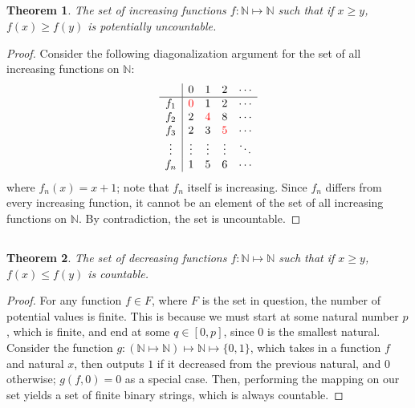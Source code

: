 \documentclass{article}
\newtheorem{theorem}{Theorem}
\newcommand{\N}{\mathbb{N}}
\begin{document}
\subsection{}

\begin{theorem}
    The set of increasing functions \(f: \N \mapsto \N\) such that if \(x \geqslant y\), \(f(x) \geqslant f(y)\) is potentially uncountable.
\end{theorem}
\begin{proof}
    Consider the following diagonalization argument for the set of all increasing functions on \(\N\):
    \begin{equation}
        \begin{array}[]{c|cccc}
            & 0 & 1 & 2 & \cdots \\
            \hline
            f_1 & {\color{red} 0} & 1 & 2 & \cdots \\
            f_2 & 2 & {\color{red} 4} & 8 & \cdots \\
            f_3 & 2 & 3 & {\color{red} 5} & \cdots \\
            \vdots & \vdots & \vdots & \vdots & \ddots \\
            f_n & 1 & 5 & 6 & \cdots
        \end{array}
    \end{equation}
    where \(f_n(x) = x + 1\); note that \(f_n\) itself is increasing.
    Since \(f_n\) differs from every increasing function, it cannot be an element of the set of all increasing functions on \(\N\).
    By contradiction, the set is uncountable.
\end{proof}

\subsection{}

\begin{theorem}
    The set of decreasing functions \(f: \N \mapsto \N\) such that if \(x \geqslant y\), \(f(x) \leqslant f(y)\) is countable.
\end{theorem}
\begin{proof}
    For any function \(f \in F\), where \(F\) is the set in question, the number of potential values is finite.
    This is because we must start at some natural number \(p\), which is finite, and end at some \(q \in [0, p]\), since \(0\) is the smallest natural.
    Consider the function \(g: (\N \mapsto \N) \mapsto \N \mapsto \{0, 1\}\), which takes in a function \(f\) and natural \(x\), then outputs \(1\) if it decreased from the previous natural, and \(0\) otherwise; \(g(f, 0) = 0\) as a special case.
    Then, performing the mapping on our set yields a set of finite binary strings, which is always countable.
\end{proof}
\end{document}
